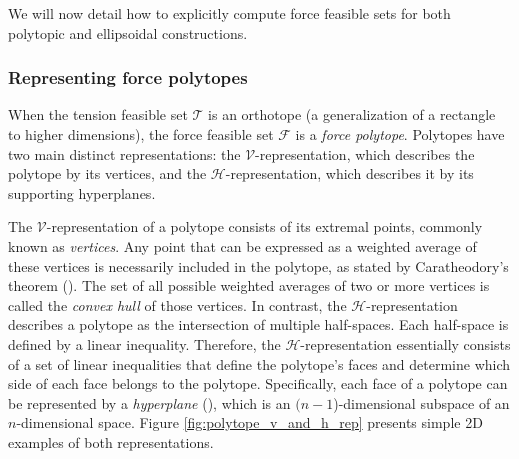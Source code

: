 We will now detail how to explicitly compute force feasible sets for both polytopic and ellipsoidal constructions.

\subsubsection*{Representing force polytopes}
When the tension feasible set $\mathcal{T}$ is an orthotope (a generalization of a rectangle to higher dimensions), the force feasible set $\mathcal{F}$ is a \emph{force polytope}. Polytopes have two main distinct representations: the $\mathcal{V}$-representation, which describes the polytope by its vertices, and the $\mathcal{H}$-representation, which describes it by its supporting hyperplanes.

The $\mathcal{V}$-representation of a polytope consists of its extremal points, commonly known as \emph{vertices}. Any point that can be expressed as a weighted average of these vertices is necessarily included in the polytope, as stated by Caratheodory's theorem (\cite{caratheodoryUberVariabilitatsbereichFourierschen1911}). The set of all possible weighted averages of two or more vertices is called the \emph{convex hull} of those vertices. In contrast, the $\mathcal{H}$-representation describes a polytope as the intersection of multiple half-spaces. Each half-space is defined by a linear inequality. Therefore, the $\mathcal{H}$-representation essentially consists of a set of linear inequalities that define the polytope's faces and determine which side of each face belongs to the polytope. Specifically, each face of a polytope can be represented by a \emph{hyperplane} (\cite{grunbaumConvexPolytopes2013}), which is an $(n-1$)-dimensional subspace of an $n$-dimensional space. Figure \ref{fig:polytope_v_and_h_rep} presents simple 2D examples of both representations.

